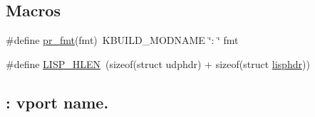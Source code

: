 \subsection*{Macros}
\begin{DoxyCompactItemize}
\item 
\#define \hyperlink{linux_2vport-lisp_8c_a1f8c165bf4196327bc3abff648276d92}{pr\+\_\+fmt}(fmt)~K\+B\+U\+I\+L\+D\+\_\+\+M\+O\+D\+N\+A\+M\+E \char`\"{}\+: \char`\"{} fmt
\item 
\#define \hyperlink{linux_2vport-lisp_8c_a432175729adc4f68dad362484b077981}{L\+I\+S\+P\+\_\+\+H\+L\+E\+N}~(sizeof(struct udphdr) + sizeof(struct \hyperlink{structlisphdr}{lisphdr}))
\end{DoxyCompactItemize}
\subsection*{\+: vport name.}
\label{_amgrp11b33af0c85e2c8a3c03b696f666e431}%
